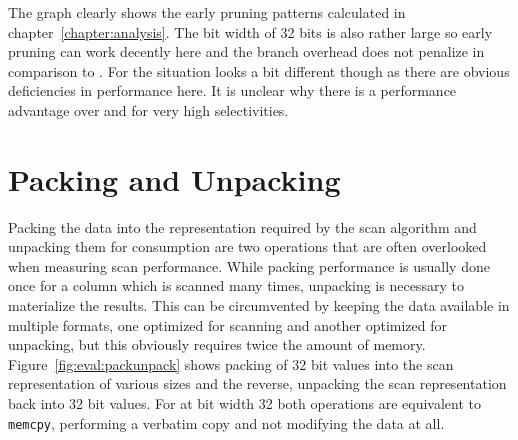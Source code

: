 The graph clearly shows the early pruning patterns calculated in
chapter~\ref{chapter:analysis}. The bit width of 32 bits is also rather large so
early pruning can work decently here and the branch overhead does not penalize
\bwv{} in comparison to \simdscan{}. For \bs{} the situation looks a bit
different though as there are obvious deficiencies in performance here. It is
unclear why there is a performance advantage over \bwv{} and \simdscan{} for
very high selectivities.

\section{Packing and Unpacking}

Packing the data into the representation required by the scan algorithm and
unpacking them for consumption are two operations that are often overlooked when
measuring scan performance. While packing performance is usually done once for a
column which is scanned many times, unpacking is necessary to materialize the
results. This can be circumvented by keeping the data available in multiple
formats, one optimized for scanning and another optimized for unpacking, but
this obviously requires twice the amount of memory.
Figure~\ref{fig:eval:packunpack} shows packing of 32 bit values into the scan
representation of various sizes and the reverse, unpacking the scan
representation back into 32 bit values. For \simdscan{} at bit width 32 both
operations are equivalent to \texttt{memcpy}, performing a verbatim copy and not
modifying the data at all.

